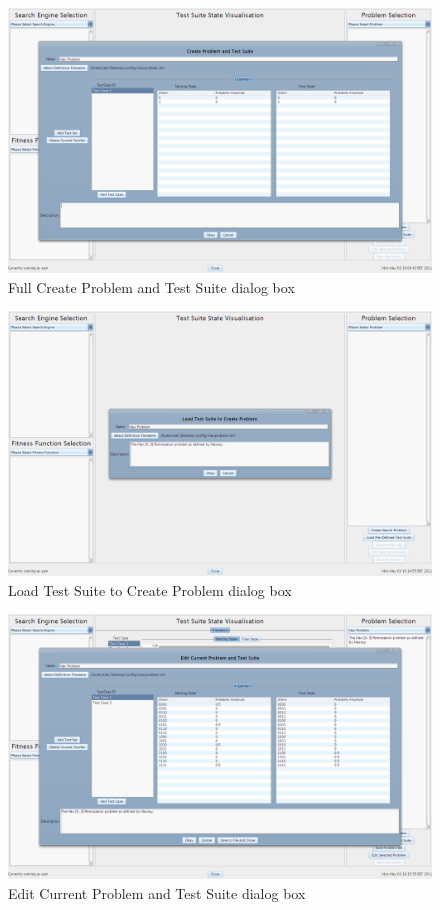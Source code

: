\begin{figure}
  \includegraphics[width=\textwidth]{walkthrough4.png}
 \caption{Full Create Problem and Test Suite dialog box}
 \label{fig:walkthrough4}
\end{figure}

\begin{figure}
  \includegraphics[width=\textwidth]{walkthrough5.png}
 \caption{Load Test Suite to Create Problem dialog box}
 \label{fig:walkthrough5}
\end{figure}

\begin{figure}
  \includegraphics[width=\textwidth]{walkthrough6.png}
 \caption{Edit Current Problem and Test Suite dialog box}
 \label{fig:walkthrough6}
\end{figure}

